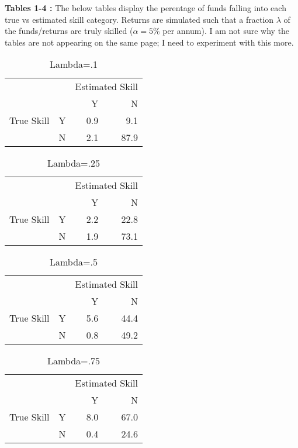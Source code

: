 \documentclass{article}
\begin{document}
\clearpage 
\textbf{Tables 1-4 : }The below tables display the perentage of funds falling into each true vs estimated skill category. Returns are simulated such that a fraction $\lambda$ of the funds/returns are truly skilled ($\alpha =5$\% per annum).  I am not sure why the tables are not appearing on the same page; I need to experiment with this more.\begin{center}
\begin{table}[h]
\centering
\caption{Lambda=.1}
\begin{tabular}{llrr}
\toprule
           &   & \multicolumn{2}{l}{Estimated Skill} \\
           &   &               Y &     N \\
\midrule
True Skill & Y &             0.9 &   9.1 \\
           & N &             2.1 &  87.9 \\
\bottomrule
\end{tabular}
\end{table}
\end{center}
\begin{center}
\begin{table}[h]
\centering
\caption{Lambda=.25}
\begin{tabular}{llrr}
\toprule
           &   & \multicolumn{2}{l}{Estimated Skill} \\
           &   &               Y &     N \\
\midrule
True Skill & Y &             2.2 &  22.8 \\
           & N &             1.9 &  73.1 \\
\bottomrule
\end{tabular}
\end{table}
\end{center}
\begin{center}
\begin{table}[h]
\centering
\caption{Lambda=.5}
\begin{tabular}{llrr}
\toprule
           &   & \multicolumn{2}{l}{Estimated Skill} \\
           &   &               Y &     N \\
\midrule
True Skill & Y &             5.6 &  44.4 \\
           & N &             0.8 &  49.2 \\
\bottomrule
\end{tabular}
\end{table}
\end{center}
\begin{center}
\begin{table}[h]
\centering
\caption{Lambda=.75}
\begin{tabular}{llrr}
\toprule
           &   & \multicolumn{2}{l}{Estimated Skill} \\
           &   &               Y &     N \\
\midrule
True Skill & Y &             8.0 &  67.0 \\
           & N &             0.4 &  24.6 \\
\bottomrule
\end{tabular}
\end{table}
\end{center}
\end{document}
